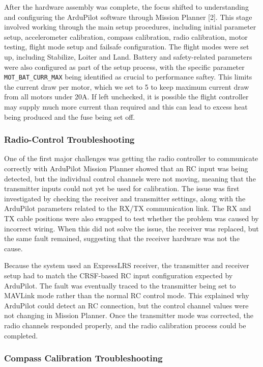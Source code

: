 \documentclass[conference]{IEEEtran}
\begin{document}
After the hardware assembly was complete, the focus shifted to understanding and configuring the ArduPilot software through Mission Planner [2]. This stage involved working through the main setup procedures, including initial parameter setup, accelerometer calibration, compass calibration, radio calibration, motor testing, flight mode setup and failsafe configuration. The flight modes were set up, including Stabilize, Loiter and Land. Battery and safety-related parameters were also configured as part of the setup process, with the specific parameter \texttt{MOT\_BAT\_CURR\_MAX} being identified as crucial to performance saftey. This limits the current draw per motor, which we set to 5 to keep maximum current draw from all motors under 20A. If left unchecked, it is possible the flight controller may supply much more current than required and this can lead to excess heat being produced and the fuse being set off. 


\subsubsection*{Radio-Control Troubleshooting}

One of the first major challenges was getting the radio controller to communicate correctly with ArduPilot Mission Planner showed that an RC input was being detected, but the individual control channels were not moving, meaning that the transmitter inputs could not yet be used for calibration. The issue was first investigated by checking the receiver and transmitter settings, along with the ArduPilot parameters related to the RX/TX communication link. The RX and TX cable positions were also swapped to test whether the problem was caused by incorrect wiring. When this did not solve the issue, the receiver was replaced, but the same fault remained, suggesting that the receiver hardware was not the cause.

Because the system used an ExpressLRS receiver, the transmitter and receiver setup had to match the CRSF-based RC input configuration expected by ArduPilot. The fault was eventually traced to the transmitter being set to MAVLink mode rather than the normal RC control mode. This explained why ArduPilot could detect an RC connection, but the control channel values were not changing in Mission Planner. Once the transmitter mode was corrected, the radio channels responded properly, and the radio calibration process could be completed.



\subsubsection*{Compass Calibration Troubleshooting}
\end{document}

